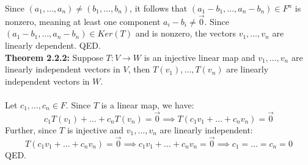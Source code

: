 \documentclass[11pt]{article}
\begin{document}
Since $(a_1 , \dots , a_n) \neq (b_1 , \dots , b_n)$, it follows that $(a_1 - b_1 , \dots , a_n - b_n) \in F^n$ is nonzero, meaning at least one component $a_i - b_i \neq \vec{0}$. Since $(a_1 - b_1 , \dots , a_n - b_n) \in Ker(T)$ and is nonzero, the vectors $v_1 , \dots , v_n$ are linearly dependent. QED. \\
\textbf{Theorem 2.2.2:} Suppose $T : V \rightarrow W$ is an injective linear map and $v_1 , \dots , v_n$ are linearly independent vectors in $V$, then $T(v_1) , \dots , T(v_n)$ are linearly independent vectors in $W$. \\
\vspace{0.1cm} \\
Let $c_1 , \dots , c_n \in F$. Since $T$ is a linear map, we have:
\begin{equation*}
    c_1 T(v_1) + \dots + c_n T(v_n) = \vec{0} \implies T(c_1 v_1 + \dots + c_n v_n) = \vec{0}
\end{equation*}
Further, since $T$ is injective and $v_1 , \dots , v_n$ are linearly independent:
\begin{equation*}
    T(c_1 v_1 + \dots + c_n v_n) = \vec{0} \implies c_1 v_1 + \dots + c_n v_n = \vec{0} \implies c_1 = \dots = c_n = 0
\end{equation*}
QED.
\end{document}
